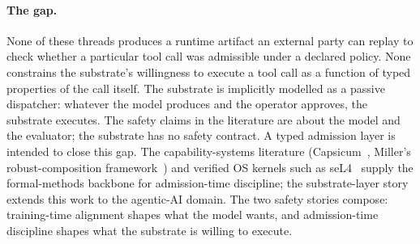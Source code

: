 \paragraph{The gap.}
None of these threads produces a runtime artifact an external party can replay to check whether a particular tool call was admissible under a declared policy. None constrains the substrate's willingness to execute a tool call as a function of typed properties of the call itself. The substrate is implicitly modelled as a passive dispatcher: whatever the model produces and the operator approves, the substrate executes. The safety claims in the literature are about the model and the evaluator; the substrate has no safety contract. A typed admission layer is intended to close this gap. The capability-systems literature (Capsicum~\cite{watson2010capsicum}, Miller's robust-composition framework~\cite{miller2006composition}) and verified OS kernels such as seL4~\cite{klein2009sel4} supply the formal-methods backbone for admission-time discipline; the substrate-layer story extends this work to the agentic-AI domain. The two safety stories compose: training-time alignment shapes what the model wants, and admission-time discipline shapes what the substrate is willing to execute.
